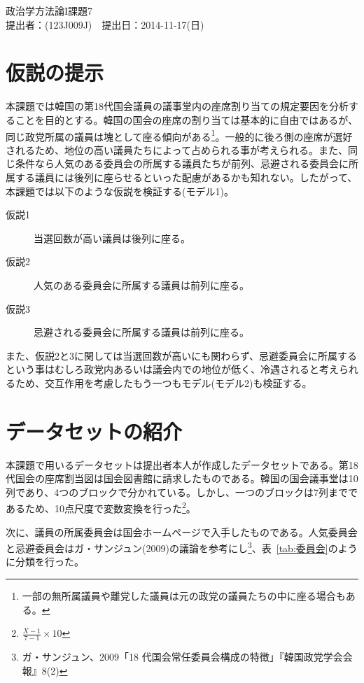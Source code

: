 \documentclass[12pt, a4j]{jsarticle}
\begin{document}
\begin{center}
{\huge 政治学方法論I課題7} \\[0.2cm]
提出者：(123J009J)　提出日：2014-11-17(日)
\end{center}


\section{仮説の提示}
本課題では韓国の第18代国会議員の議事堂内の座席割り当ての規定要因を分析することを目的とする。韓国の国会の座席の割り当ては基本的に自由ではあるが、同じ政党所属の議員は塊として座る傾向がある\footnote{一部の無所属議員や離党した議員は元の政党の議員たちの中に座る場合もある。}。一般的に後ろ側の座席が選好されるため、地位の高い議員たちによって占められる事が考えられる。また、同じ条件なら人気のある委員会の所属する議員たちが前列、忌避される委員会に所属する議員には後列に座らせるといった配慮があるかも知れない。したがって、本課題では以下のような仮説を検証する(モデル1)。\par

\begin{description}
	\item[仮説1] 当選回数が高い議員は後列に座る。
	\item[仮説2] 人気のある委員会に所属する議員は前列に座る。
	\item[仮説3] 忌避される委員会に所属する議員は前列に座る。
\end{description}

また、仮説2と3に関しては当選回数が高いにも関わらず、忌避委員会に所属するという事はむしろ政党内あるいは議会内での地位が低く、冷遇されると考えられるため、交互作用を考慮したもう一つもモデル(モデル2)も検証する。\par

\section{データセットの紹介}
本課題で用いるデータセットは提出者本人が作成したデータセットである。第18代国会の座席割当図は国会図書館に請求したものである。韓国の国会議事堂は10列であり、4つのブロックで分かれている。しかし、一つのブロックは7列までであるため、10点尺度で変数変換を行った\footnote{$\frac{X-1}{7-1} \times 10$}。\par
次に、議員の所属委員会は国会ホームページで入手したものである。人気委員会と忌避委員会はガ・サンジュン(2009)の議論を参考にし\footnote{ガ・サンジュン、2009「18 代国会常任委員会構成の特徴」『韓国政党学会会報』8(2)}、表~\ref{tab:委員会}のように分類を行った。\par
\end{document}
